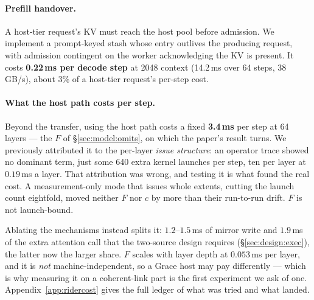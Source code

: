 \paragraph{Prefill handover.}
\label{sec:impl:stash}
A host-tier request's KV must reach the host pool before admission. We implement a
prompt-keyed stash whose entry outlives the producing request, with admission
contingent on the worker acknowledging the KV is present. It costs \textbf{0.22\,ms
per decode step} at 2048 context (14.2\,ms over 64 steps, 38\,GB/s), about 3\% of a
host-tier request's per-step cost.

\paragraph{What the host path costs per step.}
\label{sec:impl:cost}
Beyond the transfer, using the host path costs a fixed \textbf{3.4\,ms} per step at
64 layers --- the $F$ of \S\ref{sec:model:omits}, on which the paper's result turns.
We previously attributed it to the per-layer \emph{issue structure}: an operator
trace showed no dominant term, just some 640 extra kernel launches per step, ten per
layer at $0.19$\,ms a layer. That attribution was wrong, and testing it is what
found the real cost. A measurement-only mode that issues whole extents, cutting the
launch count eightfold, moved neither $F$ nor $c$ by more than their run-to-run
drift. $F$ is not launch-bound.

Ablating the mechanisms instead splits it: $1.2$--$1.5$\,ms of mirror write and
$1.9$\,ms of the extra attention call that the two-source design requires
(\S\ref{sec:design:exec}), the latter now the larger share. $F$ scales with layer
depth at $0.053$\,ms per layer, and it is \emph{not} machine-independent, so a Grace
host may pay differently --- which is why measuring it on a coherent-link part is
the first experiment we ask of one. Appendix~\ref{app:ridercost} gives the full
ledger of what was tried and what landed.
